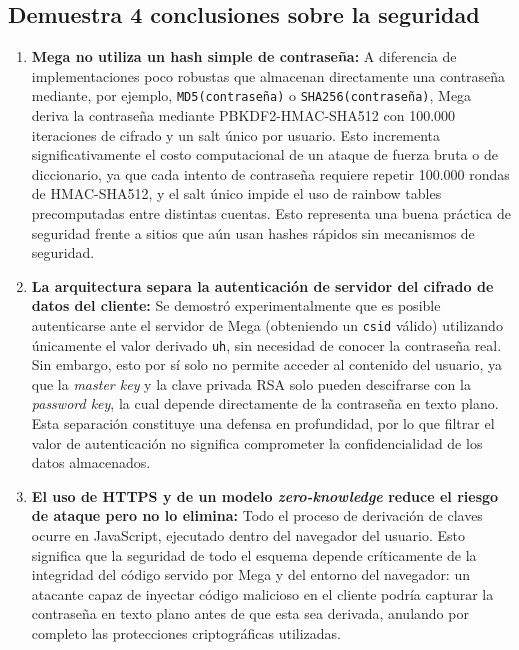 \documentclass[letter,12pt]{article}
\begin{document}
\subsection{Demuestra 4 conclusiones sobre la seguridad}

\begin{enumerate}

    \item \textbf{Mega no utiliza un hash simple de contraseña:} A diferencia de implementaciones poco robustas que almacenan directamente una contraseña mediante, por ejemplo, \texttt{MD5(contraseña)} o \texttt{SHA256(contraseña)}, Mega deriva la contraseña mediante PBKDF2-HMAC-SHA512 con 100.000 iteraciones de cifrado y un salt único por usuario. Esto incrementa significativamente el costo computacional de un ataque de fuerza bruta o de diccionario, ya que cada intento de contraseña requiere repetir 100.000 rondas de HMAC-SHA512, y el salt único impide el uso de rainbow tables precomputadas entre distintas cuentas. Esto representa una buena práctica de seguridad frente a sitios que aún usan hashes rápidos sin mecanismos de seguridad.

    \item \textbf{La arquitectura separa la autenticación de servidor del cifrado de datos del cliente:} Se demostró experimentalmente que es posible autenticarse ante el servidor de Mega (obteniendo un \texttt{csid} válido) utilizando únicamente el valor derivado \texttt{uh}, sin necesidad de conocer la contraseña real. Sin embargo, esto por sí solo no permite acceder al contenido del usuario, ya que la \textit{master key} y la clave privada RSA solo pueden descifrarse con la \textit{password key}, la cual depende directamente de la contraseña en texto plano. Esta separación constituye una defensa en profundidad, por lo que filtrar el valor de autenticación no significa comprometer la confidencialidad de los datos almacenados.


    \item \textbf{El uso de HTTPS y de un modelo \textit{zero-knowledge} reduce el riesgo de ataque pero no lo elimina:} Todo el proceso de derivación de claves ocurre en JavaScript, ejecutado dentro del navegador del usuario. Esto significa que la seguridad de todo el esquema depende críticamente de la integridad del código servido por Mega y del entorno del navegador: un atacante capaz de inyectar código malicioso en el cliente podría capturar la contraseña en texto plano antes de que esta sea derivada, anulando por completo las protecciones criptográficas utilizadas. 


\end{enumerate}
\end{document}

